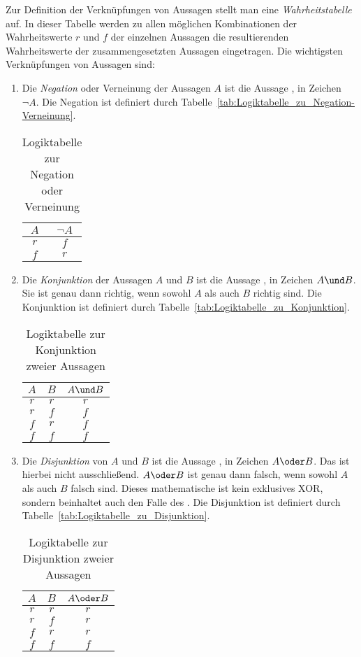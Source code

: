 Zur Definition der Verknüpfungen von Aussagen stellt man eine \emph{Wahrheitstabelle} auf. In dieser Tabelle werden zu allen möglichen Kombinationen der Wahrheitswerte $r$ und $f$ der einzelnen Aussagen die resultierenden Wahrheitswerte der zusammengesetzten Aussagen eingetragen. Die wichtigsten Verknüpfungen von Aussagen sind:
\begin{enumerate}
\item Die \emph{Negation} oder Verneinung der Aussagen $A$ ist die Aussage , in Zeichen $\neg A$. Die Negation ist definiert durch Tabelle~\vref{tab:Logiktabelle_zu_Negation-Verneinung}.
	\begin{table}[htb]
	\centering
	\begin{tabular}{c|c}
	$A$ & $\neg A$\\
	\hline
	$r$ & $f$\\
	$f$ & $r$
	\end{tabular}
	\label{tab:Logiktabelle_zu_Negation-Verneinung}
	\caption{Logiktabelle zur Negation oder Verneinung}
	\end{table}

\item Die \emph{Konjunktion} der Aussagen $A$ und $B$ ist die Aussage , in Zeichen $A \und B$. Sie ist genau dann richtig, wenn sowohl $A$ als auch $B$ richtig sind. Die Konjunktion ist definiert durch Tabelle~\vref{tab:Logiktabelle_zu_Konjunktion}.
	\begin{table}[htb]
	\centering
	\begin{tabular}{c|c|c}
	$A$ & $B$ & $A \und B$\\
	\hline
	$r$ & $r$ & $r$\\
	$r$ & $f$ & $f$\\
	$f$ & $r$ & $f$\\
	$f$ & $f$ & $f$\\
	\end{tabular}
	\label{tab:Logiktabelle_zu_Konjunktion}
	\caption{Logiktabelle zur Konjunktion zweier Aussagen}
	\end{table}

\item Die \emph{Disjunktion} von $A$ und $B$ ist die Aussage , in Zeichen $A \oder B$. Das  ist hierbei nicht ausschließend. $A \oder B$ ist genau dann falsch, wenn sowohl $A$ als auch $B$ falsch sind. Dieses mathematische  ist kein exklusives XOR, sondern beinhaltet auch den Falle des . Die Disjunktion ist definiert durch Tabelle~\vref{tab:Logiktabelle_zu_Disjunktion}.
	\begin{table}[htb]
	\centering
	\begin{tabular}{c|c|c}
	$A$ & $B$ & $A \oder B$\\
	\hline
	$r$ & $r$ & $r$\\
	$r$ & $f$ & $r$\\
	$f$ & $r$ & $r$\\
	$f$ & $f$ & $f$\\
	\end{tabular}
	\label{tab:Logiktabelle_zu_Disjunktion}
	\caption{Logiktabelle zur Disjunktion zweier Aussagen}
	\end{table}


\end{enumerate}
